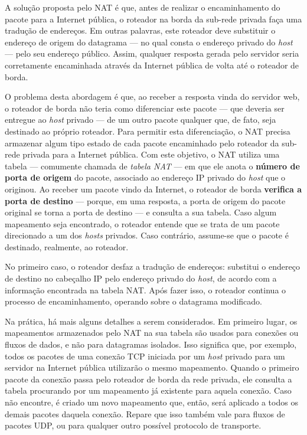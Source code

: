 \documentclass{article}
\begin{document}
A solução proposta pelo NAT é que, antes de realizar o encaminhamento do pacote para a Internet pública, o roteador na borda da sub-rede privada faça uma tradução de endereços. Em outras palavras, este roteador deve substituir o endereço de origem do datagrama --- no qual consta o endereço privado do \textit{host} --- pelo seu endereço público. Assim, qualquer resposta gerada pelo servidor seria corretamente encaminhada através da Internet pública de volta até o roteador de borda.

O problema desta abordagem é que, ao receber a resposta vinda do servidor web, o roteador de borda não teria como diferenciar este pacote --- que deveria ser entregue ao \textit{host} privado --- de um outro pacote qualquer que, de fato, seja destinado ao próprio roteador. Para permitir esta diferenciação, o NAT precisa armazenar algum tipo estado de cada pacote encaminhado pelo roteador da sub-rede privada para a Internet pública. Com este objetivo, o NAT utiliza uma tabela --- comumente chamada de \textit{tabela NAT} --- em que ele anota o \textbf{número de porta de origem} do pacote, associado ao endereço IP privado do \textit{host} que o originou. Ao receber um pacote vindo da Internet, o roteador de borda \textbf{verifica a porta de destino} --- porque, em uma resposta, a porta de origem do pacote original se torna a porta de destino --- e consulta a sua tabela. Caso algum mapeamento seja encontrado, o roteador entende que se trata de um pacote direcionado a um dos \textit{hosts} privados. Caso contrário, assume-se que o pacote é destinado, realmente, ao roteador.

No primeiro caso, o roteador desfaz a tradução de endereços: substitui o endereço de destino no cabeçalho IP pelo endereço privado do \textit{host}, de acordo com a informação encontrada na tabela NAT. Após fazer isso, o roteador continua o processo de encaminhamento, operando sobre o datagrama modificado.

Na prática, há mais alguns detalhes a serem considerados. Em primeiro lugar, os mapeamentos armazenados pelo NAT na sua tabela são usados para conexões ou fluxos de dados, e não para datagramas isolados. Isso significa que, por exemplo, todos os pacotes de uma conexão TCP iniciada por um \textit{host} privado para um servidor na Internet pública utilizarão o mesmo mapeamento. Quando o primeiro pacote da conexão passa pelo roteador de borda da rede privada, ele consulta a tabela procurando por um mapeamento já existente para aquela conexão. Caso não encontre, é criado um novo mapeamento que, então, será aplicado a todos os demais pacotes daquela conexão. Repare que isso também vale para fluxos de pacotes UDP, ou para qualquer outro possível protocolo de transporte.
\end{document}

